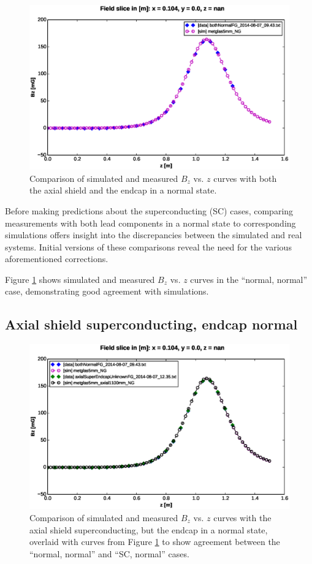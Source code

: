 \documentclass[twocolumn,aps,prb,citeautoscript]{revtex4-1}
\begin{document}
\begin{figure}
    \includegraphics[width=\textwidth]{figures/normnorm_comp.eps}
    \caption{\label{fig:normnorm_comp}Comparison of simulated and measured $B_z$ vs. $z$ curves with
    both the axial shield and the endcap in a normal state.}
\end{figure}

Before making predictions about the superconducting (SC) cases, comparing measurements with both lead components in
a normal state to corresponding simulations offers insight into the discrepancies between the simulated and real
systems. Initial versions of these comparisons reveal the need for the various aforementioned corrections.

Figure \ref{fig:normnorm_comp} shows simulated and measured $B_z$ vs. $z$ curves in the ``normal, normal'' case,
demonstrating good agreement with simulations.

\subsection{Axial shield superconducting, endcap normal}

\begin{figure}
    \includegraphics[width=\textwidth]{figures/SCnorm_comp.eps}
    \caption{\label{fig:SCnorm_comp}Comparison of simulated and measured $B_z$ vs. $z$ curves with the
    axial shield superconducting, but the endcap in a normal state, overlaid with curves from Figure
     \ref{fig:normnorm_comp} to show agreement between the ``normal, normal'' and ``SC, normal'' cases.}
\end{figure}
\end{document}
